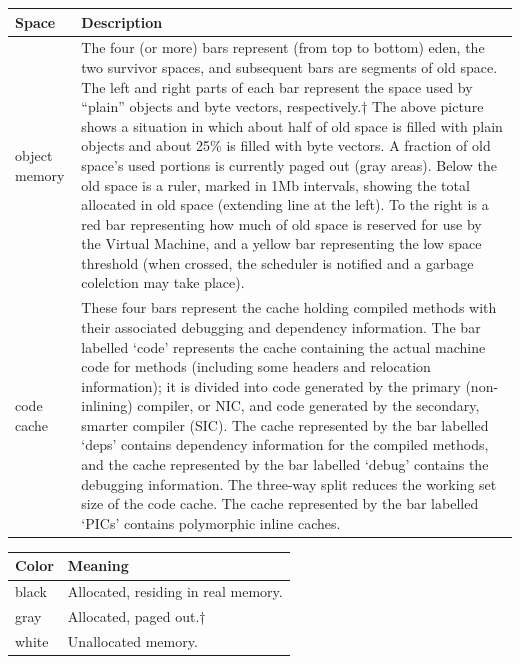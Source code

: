 \documentclass[letterpaper,10pt,english]{sphinxmanual}
\begin{document}
\begin{tabulary}{\linewidth}{p{5cm} p{10cm}}
\hline
\textbf{
Space
} & \textbf{
Description
}\\\hline

object memory
 & 
The four (or more) bars represent (from top to bottom) eden, the two survivor spaces, and subsequent
bars are segments of old space. The left and right parts of each bar represent the space used
by “plain” objects and byte vectors, respectively.† The above picture shows a situation in which
about half of old space is filled with plain objects and about 25\% is filled with byte vectors. A fraction
of old space’s used portions is currently paged out (gray areas).
Below the old space is a ruler, marked in 1Mb intervals, showing the total allocated in old space
(extending line at the left). To the right is a red bar representing how much of old space is reserved
for use by the Virtual Machine, and a yellow bar representing the low space threshold (when
crossed, the scheduler is notified and a garbage colelction may take place).
\\\hline

code cache
 & 
These four bars represent the cache holding compiled methods with their associated debugging and
dependency information. The bar labelled ‘code’ represents the cache containing the actual
machine code for methods (including some headers and relocation information); it is divided into
code generated by the primary (non-inlining) compiler, or NIC, and code generated by the
secondary, smarter compiler (SIC). The cache represented by the bar labelled ‘deps’ contains
dependency information for the compiled methods, and the cache represented by the bar labelled
‘debug’ contains the debugging information. The three-way split reduces the working set size of the
code cache. The cache represented by the bar labelled ‘PICs’ contains polymorphic inline caches.
\\\hline
\end{tabulary}




\begin{tabulary}{\linewidth}{p{5cm} p{10cm}}
\hline
\textbf{
Color
} & \textbf{
Meaning
}\\\hline

black
 & 
Allocated, residing in real memory.
\\\hline

gray
 & 
Allocated, paged out.†
\\\hline

white
 & 
Unallocated memory.
\\\hline
\end{tabulary}
\end{document}

